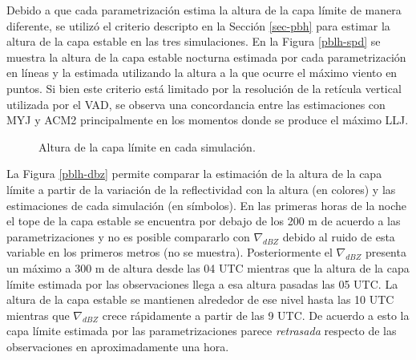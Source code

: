 \documentclass[12pt,spanish,oneside, a4paper]{book}
\begin{document}
Debido a que cada parametrización estima la altura de la capa límite de
manera diferente, se utilizó el criterio descripto en la Sección
\ref{sec-pbh} para estimar la altura de la capa estable en las tres
simulaciones. En la Figura \ref{pblh-spd} se muestra la altura de la
capa estable nocturna estimada por cada parametrización en líneas y la
estimada utilizando la altura a la que ocurre el máximo viento en
puntos. Si bien este criterio está limitado por la resolución de la
retícula vertical utilizada por el VAD, se observa una concordancia
entre las estimaciones con MYJ y ACM2 principalmente en los momentos
donde se produce el máximo LLJ.

\begin{figure}

{\centering {}\newline{}

}

\caption{Altura de la capa límite en cada simulación. \label{pblh-wrf}}\label{fig:pblh-wrf}
\end{figure}

La Figura \ref{pblh-dbz} permite comparar la estimación de la altura de
la capa límite a partir de la variación de la reflectividad con la
altura (en colores) y las estimaciones de cada simulación (en símbolos).
En las primeras horas de la noche el tope de la capa estable se
encuentra por debajo de los 200 m de acuerdo a las parametrizaciones y
no es posible compararlo con \(\nabla_{dBZ}\) debido al ruido de esta
variable en los primeros metros (no se muestra). Posteriormente el
\(\nabla_{dBZ}\) presenta un máximo a 300 m de altura desde las 04 UTC
mientras que la altura de la capa límite estimada por las observaciones
llega a esa altura pasadas las 05 UTC. La altura de la capa estable se
mantienen alrededor de ese nivel hasta las 10 UTC mientras que
\(\nabla_{dBZ}\) crece rápidamente a partir de las 9 UTC. De acuerdo a
esto la capa límite estimada por las parametrizaciones parece
\emph{retrasada} respecto de las observaciones en aproximadamente una
hora.
\end{document}
